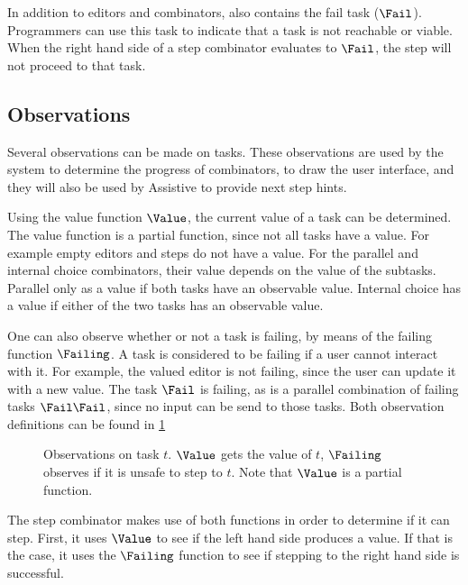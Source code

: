 In addition to editors and combinators, \TOPHAT also contains the fail task ($\Fail$).
Programmers can use this task to indicate that a task is not reachable or viable.
When the right hand side of a step combinator evaluates to $\Fail$, the step will not proceed to that task.


\subsection{Observations}

Several observations can be made on tasks.
These observations are used by the system to determine the progress of combinators,
to draw the user interface, and they will also be used by Assistive \TOPHAT to provide next step hints.

Using the value function $\Value$, the current value of a task can be determined.
The value function is a partial function, since not all tasks have a value.
For example empty editors and steps do not have a value.
For the parallel and internal choice combinators, their value depends on the value of the subtasks.
Parallel only as a value if both tasks have an observable value.
Internal choice has a value if either of the two tasks has an observable value.

One can also observe whether or not a task is failing, by means of the failing function $\Failing$.
A task is considered to be failing if a user cannot interact with it.
For example, the valued editor is not failing, since the user can update it with a new value.
The task $\Fail$ is failing, as is a parallel combination of failing tasks $\Fail \And \Fail$, since no input can be send to those tasks.
Both observation definitions can be found in \cref{fig:observations}

\begin{figure}[h]
  \begin{minipage}{\textwidth}
    \centering \small
      
  \end{minipage}
  \caption{
    Observations on task $t$.
    $\Value$ gets the value of $t$, $\Failing$ observes if it is unsafe to step to $t$.
    Note that $\Value$ is a partial function.
  }
  \label{fig:observations}
\end{figure}

The step combinator makes use of both functions in order to determine if it can step.
First, it uses $\Value$ to see if the left hand side produces a value.
If that is the case, it uses the $\Failing$ function to see if stepping to the right hand side is successful.


